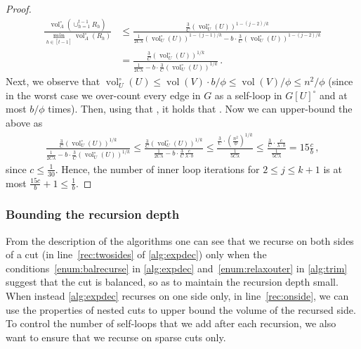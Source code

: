 \documentclass[epsfig,letter,11pt]{article}
\numberwithin{equation}{section}
\DeclareMathOperator{\vol}{vol}
\newcommand{\unvolc}[2]{\operatorname{vol}_{#2}^\circ (#1)}
\begin{document}
\begin{proof}
	\begin{align*}
		\frac{\unvolc{\cup_{h=1}^{t-1} R_h}{A}}{\min_{h \in [t-1]} \unvolc{R_h}{A}} & \le
		\frac{\frac{3}{C}\left(\unvolc{U}{U}\right)^{1-(j-2)/k}}{\frac{1}{2C\lambda}\left(\unvolc{U}{U}\right)^{1-(j-1)/k} - b \cdot \frac{3}{C}\left(\unvolc{U}{U}\right)^{1-(j-2)/k}} \\
		& = \frac{\frac{3}{C}\left(\unvolc{U}{U}\right)^{1/k}}{\frac{1}{2C\lambda} - b \cdot \frac{3}{C}\left(\unvolc{U}{U}\right)^{1/k}} \, .
	\end{align*}
	Next, we observe that $\unvolc{U}{U} \le \vol(V)\cdot b/\phi \le \vol(V)/{\phi} \le n^2/\phi$ (since in the worst case we over-count every edge in $G$ as a self-loop in $G[U]^{\circ}$ and  at most $b/\phi$ times). Then, using that , it holds that \smash{$\left(\unvolc{U}{U}\right)^{1/k} \leq \frac{c}{\lambda \cdot b}$}. Now we can upper-bound the above as
	\begin{align*}
		\frac{\frac{3}{C}\left(\unvolc{U}{U}\right)^{1/k}}{\frac{1}{2C\lambda} - b \cdot \frac{3}{C}\left(\unvolc{U}{U}\right)^{1/k}}  \le \frac{\frac{3}{C}\left(\unvolc{U}{U}\right)^{1/k}}{\frac{1}{2C\lambda} - b \cdot \frac{3}{C}\frac{c}{\lambda \cdot b}} \le \frac{\frac{3}{C} \cdot \left(\frac{n^2}{\phi}\right)^{1/k}}{\frac{1}{5C \lambda} } \le \frac{\frac{3}{C} \cdot \frac{c}{\lambda \cdot b}}{\frac{1}{5C \lambda}} = 15 \frac{c}{b}\, ,
	\end{align*}
	since $c \le \frac{1}{30}$.	Hence, the number of inner loop iterations for $2 \le j \le k+1$ is at most $ \frac{15c}{b} +1\le \frac{1}{b}$.
\end{proof}

\subsubsection{Bounding the recursion depth}
\label{subsubsec:depth}
\noindent
From the description of the algorithms one can see that we recurse on both sides of a cut (in line~\eqref{rec:twosides} of \cref{alg:expdec}) only when the conditions~\eqref{enum:balrecurse} in \cref{alg:expdec} and~\eqref{enum:relaxouter} in \cref{alg:trim} suggest that the cut is balanced, so as to maintain the recursion depth small. When instead \cref{alg:expdec} recurses on one side only, in line~\eqref{rec:onside}, we can use the properties of nested cuts to upper bound the volume of the recursed side. To control the number of self-loops that we add after each recursion, we also want to ensure that we recurse on sparse cuts only.
\end{document}
